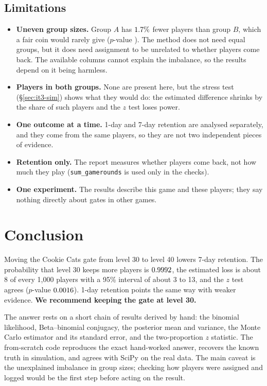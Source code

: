 \documentclass[11pt]{article}
\theoremstyle{definition}
\theoremstyle{remark}
\begin{document}
\subsection{Limitations}\label{sec:limitations}
\begin{itemize}[nosep]
\item \textbf{Uneven group sizes.} Group $A$ has $1.7\%$ fewer players than group $B$, which a fair coin
  would rarely give ($p$-value \asOneSplitP). The method does not need equal groups, but it does need assignment to
  be unrelated to whether players come back. The available columns cannot explain the imbalance, so the results
  depend on it being harmless.
\item \textbf{Players in both groups.} None are present here, but the stress test (\S\ref{sec:it3-sim}) shows what
  they would do: the estimated difference shrinks by the share of such players and the $z$ test loses power.
\item \textbf{One outcome at a time.} 1-day and 7-day retention are analysed separately, and they come from the
  same players, so they are not two independent pieces of evidence.
\item \textbf{Retention only.} The report measures whether players come back, not how much they play
  (\texttt{sum\_gamerounds} is used only in the checks).
\item \textbf{One experiment.} The results describe this game and these players; they say nothing directly about
  gates in other games.
\end{itemize}

\section{Conclusion}\label{sec:conclusion}
Moving the Cookie Cats gate from level 30 to level 40 lowers 7-day retention. The probability that level 30 keeps
more players is $0.9992$, the estimated loss is about 8 of every 1{,}000 players with a 95\% interval of
about 3 to 13, and the $z$ test agrees ($p$-value $0.0016$). 1-day retention points the same way with weaker
evidence. \textbf{We recommend keeping the gate at level 30.}

The answer rests on a short chain of results derived by hand: the binomial likelihood, Beta--binomial conjugacy,
the posterior mean and variance, the Monte Carlo estimator and its standard error, and the two-proportion $z$
statistic. The from-scratch code reproduces the exact hand-worked answer, recovers the known truth in simulation,
and agrees with SciPy on the real data. The main caveat is the unexplained imbalance in group sizes; checking how
players were assigned and logged would be the first step before acting on the result.
\end{document}
